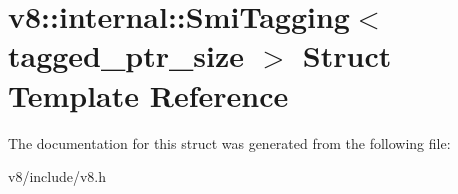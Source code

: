 \hypertarget{structv8_1_1internal_1_1SmiTagging}{}\section{v8\+:\+:internal\+:\+:Smi\+Tagging$<$ tagged\+\_\+ptr\+\_\+size $>$ Struct Template Reference}
\label{structv8_1_1internal_1_1SmiTagging}


The documentation for this struct was generated from the following file\+:\begin{DoxyCompactItemize}
\item 
v8/include/v8.\+h\end{DoxyCompactItemize}
